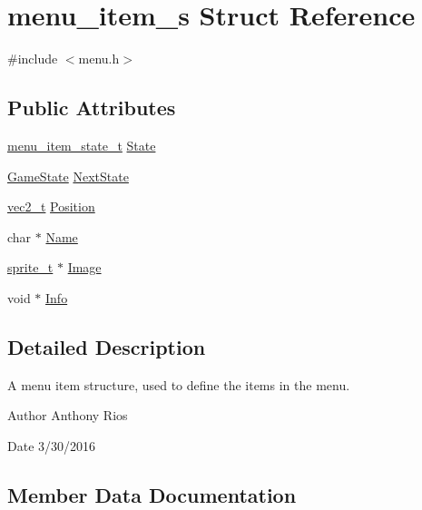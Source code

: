 \hypertarget{structmenu__item__s}{}\section{menu\+\_\+item\+\_\+s Struct Reference}
\label{structmenu__item__s}


{\ttfamily \#include $<$menu.\+h$>$}

\subsection*{Public Attributes}
\begin{DoxyCompactItemize}
\item 
\hyperlink{globals_8h_a82d3a17b01eab2136e9f3ee50640b89f}{menu\+\_\+item\+\_\+state\+\_\+t} \hyperlink{structmenu__item__s_a5b54d5038e642351205745ebeae836e4}{State}
\item 
\hyperlink{globals_8h_a7899b65f1ea0f655e4bbf8d2a5714285}{Game\+State} \hyperlink{structmenu__item__s_a75452e55959415b680bb07ed7b97f4a2}{Next\+State}
\item 
\hyperlink{globals_8h_a773f2054819bb6014f1e50baa39cb5e3}{vec2\+\_\+t} \hyperlink{structmenu__item__s_a59128f8d229e03ff7a5d70e230c60797}{Position}
\item 
char $\ast$ \hyperlink{structmenu__item__s_aec315df255579720166ff7b8839480d7}{Name}
\item 
\hyperlink{graphics_8h_a5371414b10358aeda7c6bcec8196342f}{sprite\+\_\+t} $\ast$ \hyperlink{structmenu__item__s_aacd90028224c5c683113447b0fe8df5d}{Image}
\item 
void $\ast$ \hyperlink{structmenu__item__s_a347d86d002232139852a36d6ce2ad702}{Info}
\end{DoxyCompactItemize}


\subsection{Detailed Description}
A menu item structure, used to define the items in the menu.

\begin{DoxyAuthor}{Author}
Anthony Rios 
\end{DoxyAuthor}
\begin{DoxyDate}{Date}
3/30/2016 
\end{DoxyDate}


\subsection{Member Data Documentation}
